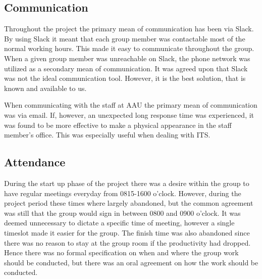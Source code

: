 \subsection{Communication}
Throughout the project the primary mean of communication has been via Slack. 
By using Slack it meant that each group member was contactable most of the normal working hours.
This made it easy to communicate throughout the group. 
When a given group member was unreachable on Slack, the phone network was utilized as a secondary mean of communication.
It was agreed upon that Slack was not the ideal communication tool. 
However, it is the best solution, that is known and available to us.

When communicating with the staff at AAU the primary mean of communication was via email.
If, however, an unexpected long response time was experienced, it was found to be more effective to make a physical appearance in the staff member's office.
This was especially useful when dealing with ITS.

\subsection{Attendance}
During the start up phase of the project there was a desire within the group to have regular meetings everyday from 0815-1600 o'clock.
However, during the project period these times where largely abandoned, but the common agreement was still that the group would sign in between 0800 and 0900 o'clock.
It was deemed unnecessary to dictate a specific time of meeting, however a single timeslot made it easier for the group. 
The finish time was also abandoned since there was no reason to stay at the group room if the productivity had dropped.
Hence there was no formal specification on when and where the group work should be conducted, but there was an oral agreement on how the work should be conducted.
